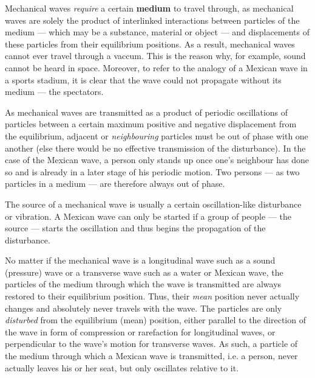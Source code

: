 \begin{itemize}


	Mechanical waves \emph{require} a certain \textbf{medium} to travel through, as mechanical waves are solely the product of interlinked interactions between particles of the medium --- which may be a substance, material or object --- and displacements of these particles from their equilibrium positions. As a result, mechanical waves cannot ever travel through a vaccum. This is the reason why, for example, sound cannot be heard in space. Moreover, to refer to the analogy of a Mexican wave in a sports stadium, it is clear that the wave could not propagate without its medium --- the spectators.


	As mechanical waves are transmitted as a product of periodic oscillations of particles between a certain maximum positive and negative displacement from the equilibrium, adjacent or \emph{neighbouring} particles must be out of phase with one another (else there would be no effective transmission of the disturbance). In the case of the Mexican wave, a person only stands up once one's neighbour has done so and is already in a later stage of his periodic motion. Two persons --- as two particles in a medium --- are therefore always out of phase.


	The source of a mechanical wave is usually a certain oscillation-like disturbance or vibration. A Mexican wave can only be started if a group of people --- the source --- starts the oscillation and thus begins the propagation of the disturbance.


	No matter if the mechanical wave is a longitudinal wave such as a sound (pressure) wave or a transverse wave such as a water or Mexican wave, the particles of the medium through which the wave is transmitted are always restored to their equilibrium position. Thus, their \emph{mean} position never actually changes and absolutely never travels with the wave. The particles are only \emph{disturbed} from the equilibrium (mean) position, either parallel to the direction of the wave in form of compression or rarefaction for longitudinal waves, or perpendicular to the wave's motion for transverse waves. As such, a particle of the medium through which a Mexican wave is transmitted, i.e. a person, never actually leaves his or her seat, but only oscillates relative to it.


\end{itemize}
